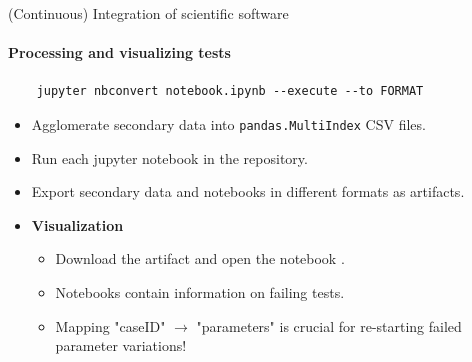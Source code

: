 \begin{frame}[fragile]{(Continuous) Integration of scientific software} 
\framesubtitle{Processing and visualizing tests}
\vfill

    \vfill

    \begin{verbatim}
    jupyter nbconvert notebook.ipynb --execute --to FORMAT
    \end{verbatim}

    \medskip

    \begin{itemize}
        \item Agglomerate secondary data into \texttt{pandas.MultiIndex} CSV files. 
        \item Run each jupyter notebook in the repository.
        \item Export secondary data and notebooks in different formats as artifacts.
        \item \textbf{Visualization} 
            \begin{itemize}
                \item Download the artifact and open the notebook \faGraduationCap.
                \item Notebooks contain information on failing tests. 
                \item Mapping "caseID" $\to$ "parameters" is crucial for re-starting failed parameter variations! 
            \end{itemize}
    \end{itemize}

\end{frame}

